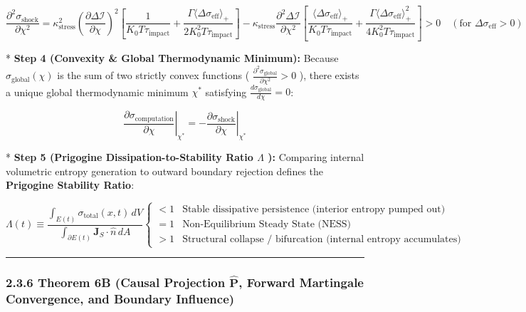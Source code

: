 \documentclass[11pt,a4paper]{article}
\theoremstyle{definition}\newtheorem{definition}{Definition}
\theoremstyle{remark}\newtheorem{remark}{Remark}
\begin{document}
\begin{equation}
\boxed{\frac{\partial^2 \sigma_{\text{shock}}}{\partial \chi^2} = \kappa_{\text{stress}}^2 \left(\frac{\partial \Delta \mathcal{I}}{\partial \chi}\right)^2 [ \frac{1}{K_0 T \tau_{\text{impact}}} + \frac{\Gamma \langle \Delta \sigma_{\text{eff}} \rangle_+}{2 K_0^2 T \tau_{\text{impact}}} ] - \kappa_{\text{stress}} \frac{\partial^2 \Delta \mathcal{I}}{\partial \chi^2} [ \frac{\langle \Delta \sigma_{\text{eff}} \rangle_+}{K_0 T \tau_{\text{impact}}} + \frac{\Gamma \langle \Delta \sigma_{\text{eff}} \rangle_+^2}{4 K_0^2 T \tau_{\text{impact}}} ] > 0 \quad (\text{for } \Delta \sigma_{\text{eff}} > 0)}
\end{equation}


* \textbf{Step 4 (Convexity \& Global Thermodynamic Minimum):}
Because $\sigma_{\text{global}}(\chi)$ is the sum of two strictly convex functions ( $\frac{\partial^2 \sigma_{\text{global}}}{\partial \chi^2} > 0$ ), there exists a unique global thermodynamic minimum $\chi^*$ satisfying $\frac{d\sigma_{\text{global}}}{d\chi} = 0$:


\begin{equation}
\boxed{\left. \frac{\partial \sigma_{\text{computation}}}{\partial \chi} \right|_{\chi^*} = -\left. \frac{\partial \sigma_{\text{shock}}}{\partial \chi} \right|_{\chi^*}}
\end{equation}


* \textbf{Step 5 (Prigogine Dissipation-to-Stability Ratio $\Lambda$ ):}
Comparing internal volumetric entropy generation to outward boundary rejection defines the \textbf{Prigogine Stability Ratio}:


\begin{equation}
\boxed{\Lambda(t) \equiv \frac{\int_{E(t)} \sigma_{\text{total}}(x, t) \, dV}{\int_{\partial E(t)} \mathbf{J}_S \cdot \hat{n} \, dA} \begin{cases} < 1 & \text{Stable dissipative persistence (interior entropy pumped out)} \\ = 1 & \text{Non-Equilibrium Steady State (NESS)} \\ > 1 & \text{Structural collapse / bifurcation (internal entropy accumulates)} \end{cases}}
\end{equation}


\noindent\rule{\linewidth}{0.4pt}
\subsubsection{2.3.6 Theorem 6B (Causal Projection $\hat{\mathbf{P}}$, Forward Martingale Convergence, and Boundary Influence)}
\end{document}
